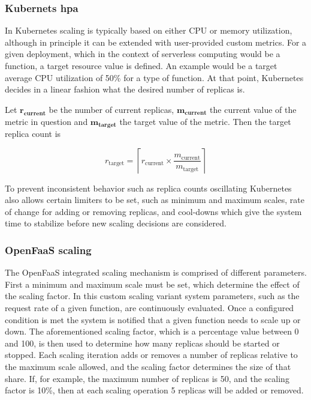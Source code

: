 \documentclass[draft,final]{vutinfth} %
\begin{document}
\subsubsection{Kubernets \gls{hpa}}
In Kubernetes scaling is typically based on either CPU or memory utilization, although in principle it can be extended with user-provided custom metrics\cite{kubernetes-hpa}.
For a given deployment, which in the context of serverless computing would be a function, a target resource value is defined.
An example would be a target average CPU utilization of 50\% for a type of function.
At that point, Kubernetes decides in a linear fashion what the desired number of replicas is.

Let $\mathbf{r_{\text{current}}}$ be the number of current replicas, $\mathbf{m_{\text{current}}}$ the current value of the metric in question and $\mathbf{m_{\text{target}}}$ the target value of the metric.
Then the target replica count is

\[ r_{\text{target}} = \left \lceil r_{\text{current}} \times \frac{m_{\text{current}}}{m_{\text{target}}} \right \rceil\]

To prevent inconsistent behavior such as replica counts oscillating Kubernetes also allows certain limiters to be set, such as minimum and maximum scales, rate of change for adding or removing replicas, and cool-downs which give the system time to stabilize before new scaling decisions are considered\cite{kubernetes-hpa}.

\subsubsection{OpenFaaS scaling}
The OpenFaaS integrated scaling mechanism is comprised of different parameters.
First a minimum and maximum scale must be set, which determine the effect of the scaling factor.
In this custom scaling variant system parameters, such as the request rate of a given function, are continuously evaluated.
Once a configured condition is met the system is notified that a given function needs to scale up or down.
The aforementioned scaling factor, which is a percentage value between 0 and 100, is then used to determine how many replicas should be started or stopped\cite{openfaas-autoscaling}.
Each scaling iteration adds or removes a number of replicas relative to the maximum scale allowed, and the scaling factor determines the size of that share.
If, for example, the maximum number of replicas is 50, and the scaling factor is 10\%, then at each scaling operation 5 replicas will be added or removed.
\end{document}
